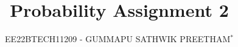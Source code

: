 \documentclass[journal,12pt,twocolumn]{IEEEtran}
\begin{document}
\let\vec\mathbf




\vspace{3cm}

\title{Probability Assignment 2 }
\author{EE22BTECH11209 - GUMMAPU SATHWIK PREETHAM$^{*}$%
}


%
%
%

% 
%
\end{document}

